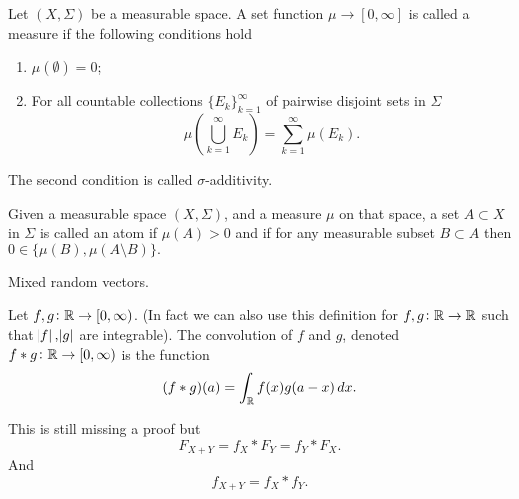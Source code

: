 \documentclass[11pt,a4paper]{article}
\begin{document}
  \begin{definition}[Measure]
    Let $(X, \Sigma)$ be a measurable space.
    A set function $\mu \to [0,\infty]$ is called a measure if the following
    conditions hold
    \begin{enumerate}
      \item $\mu(\emptyset) = 0$;
      \item For all countable collections $\{E_{k}\}_{k=1}^{\infty }$ of
            pairwise disjoint sets in $\Sigma$
            \[ \mu \left(\bigcup _{k=1}^{\infty }E_{k}\right) =
               \sum _{k=1}^{\infty }\mu (E_{k}). \]
    \end{enumerate}
    The second condition is called $\sigma$-additivity.
  \end{definition}
  \begin{definition}[Atom]
    Given a measurable space $(X, \Sigma)$, and a measure $\mu$ on that
    space, a set $A \subset X$ in $\Sigma$ is called an atom if
    $\mu (A)>0$ and if for any measurable subset $B \subset A$ then
    $0\in \{\mu (B),\mu (A\setminus B)\}.$
  \end{definition}
  
  Mixed random vectors.

  \begin{definition}[Convolution]
    Let $f,g \colon \mathbb{R} \to [0,\infty)$. (In fact we can also use this 
    definition for $f,g \colon \mathbb{R} \to \mathbb{R}$ such that $\abs{f},\abs{g}$
    are integrable). The convolution of $f$ and $g$, denoted
    $f * g \colon \mathbb{R} \to [0,\infty)$ is the function
    \[
      (f * g)(a) = \int_{\mathbb{R}}f(x)g(a-x)\,dx.
    \]
  \end{definition}
  This is still missing a proof but
  \[
    F_{X+Y} = f_X * F_Y = f_Y * F_X.
  \]
  And
  \[
    f_{X+Y} = f_X * f_Y.
  \]

  \newpage
\end{document}
